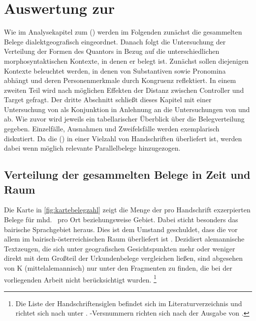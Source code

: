 \chapter{Auswertung zur }
\label{ch:kcanalyse}

Wie im Analysekapitel zum  (\CAO)
werden im Folgenden zunächst die gesammelten Belege dialektgeografisch
eingeordnet. Danach folgt die Untersuchung der Verteilung der Formen des
Quantors  in Bezug auf die unterschiedlichen morphosyntaktischen
Kontexte, in denen er belegt ist. Zunächst sollen diejenigen Kontexte
beleuchtet werden, in denen  von Substantiven sowie Pronomina
abhängt und deren Personenmerkmale durch Kongruenz reflektiert. In einem
zweiten Teil wird nach möglichen Effekten der Distanz zwischen Controller und
Target gefragt. Der dritte Abschnitt schließt dieses Kapitel mit einer
Untersuchung von  als Konjunktion in Anlehnung an die
Untersuchungen von \citet{askedal1974} und \citet{gjelsten1980} ab. Wie zuvor
wird jeweils ein tabellarischer Überblick über die Belegverteilung gegeben.
Einzelfälle, Ausnahmen und Zweifelsfälle werden exemplarisch diskutiert. Da die
 (\KC{}) in einer Vielzahl von Handschriften überliefert
ist, werden dabei wenn möglich relevante Parallelbelege hinzugezogen.

\section{Verteilung der gesammelten Belege in Zeit und Raum}
\label{subsec:beiddispmap}

Die Karte in \cref{fig:kartebelegzahl} zeigt die Menge der pro Handschrift
exzerpierten Belege für mhd.\  pro Ort beziehungsweise Gebiet. Dabei
sticht besonders das bairische Sprachgebiet heraus. Dies ist dem Umstand
geschuldet, dass die \KC{} vor allem im bairisch-österreichischen Raum
überliefert ist \autocite{klein1988}. Dezidiert alemannische Textzeugen, die
sich unter geografischen Gesichtspunkten mehr oder weniger direkt mit dem
Großteil der Urkundenbelege vergleichen ließen, sind abgesehen von K
(mittelalemannisch) nur unter den Fragmenten zu finden, die bei der
vorliegenden Arbeit nicht berücksichtigt wurden.%
%
	\footnote{Die Liste der Handschriftensiglen befindet sich im
		Literaturverzeichnis und richtet sich nach  unter
		. \KC{}-Versnummern richten sich nach der
		Ausgabe von \nosh\citet{schroeder1895}.%
	}

